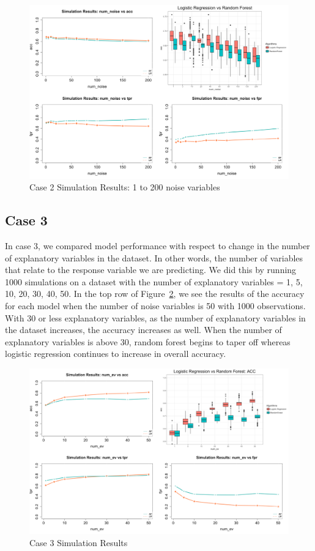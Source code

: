 \documentclass{llncs}
\begin{document}
\begin{figure}
\centering
\includegraphics[scale=0.55]{case2_b.png}
\caption{Case 2 Simulation Results: 1 to 200 noise variables}
\label{fig:case2resultsb}
\end{figure}

\subsection{Case 3}
In case 3, we compared model performance with respect to change in the number of explanatory variables in the dataset.  In other words, the number of variables that relate to the response variable we are predicting. We did this by running 1000 simulations on a dataset with the number of explanatory variables = 1, 5, 10, 20, 30, 40, 50.  In the top row of Figure~\ref{fig:case3results}, we see the results of the accuracy for each model when the number of noise variables is 50 with 1000 observations.  With 30 or less explanatory variables, as the number of explanatory variables in the dataset increases, the accuracy increases as well.  When the number of explanatory variables is above 30, random forest begins to taper off whereas logistic regression continues to increase in overall accuracy. 

\begin{figure}
\centering
\includegraphics[scale=0.55]{case3.png}
\caption{Case 3 Simulation Results}
\label{fig:case3results}
\end{figure}
\end{document}
